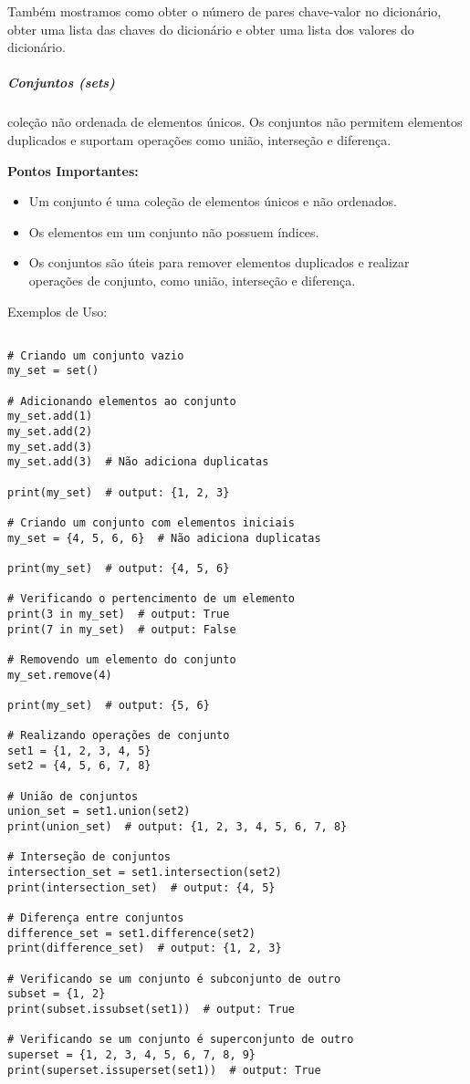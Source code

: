 \documentclass[a4paper, 12pt, onecolumn,singlespacing]{article}
\begin{document}
Também mostramos como obter o número de pares chave-valor no dicionário, obter uma lista das chaves do dicionário e obter uma lista dos valores do dicionário.

	\subparagraph{Conjuntos (\textit{sets})}\label{python_estrutura_conjuntos} coleção não ordenada de elementos únicos. Os conjuntos não permitem elementos duplicados e suportam operações como união, interseção e diferença.
	
	\textbf{Pontos Importantes:}
	\begin{itemize}
		\item Um conjunto é uma coleção de elementos únicos e não ordenados.
		\item Os elementos em um conjunto não possuem índices.
		\item Os conjuntos são úteis para remover elementos duplicados e realizar operações de conjunto, como união, interseção e diferença.
	\end{itemize}
		Exemplos de Uso:
	
	\begin{verbatim}

# Criando um conjunto vazio
my_set = set()

# Adicionando elementos ao conjunto
my_set.add(1)
my_set.add(2)
my_set.add(3)
my_set.add(3)  # Não adiciona duplicatas

print(my_set)  # output: {1, 2, 3}

# Criando um conjunto com elementos iniciais
my_set = {4, 5, 6, 6}  # Não adiciona duplicatas

print(my_set)  # output: {4, 5, 6}

# Verificando o pertencimento de um elemento
print(3 in my_set)  # output: True
print(7 in my_set)  # output: False

# Removendo um elemento do conjunto
my_set.remove(4)

print(my_set)  # output: {5, 6}

# Realizando operações de conjunto
set1 = {1, 2, 3, 4, 5}
set2 = {4, 5, 6, 7, 8}

# União de conjuntos
union_set = set1.union(set2)
print(union_set)  # output: {1, 2, 3, 4, 5, 6, 7, 8}

# Interseção de conjuntos
intersection_set = set1.intersection(set2)
print(intersection_set)  # output: {4, 5}

# Diferença entre conjuntos
difference_set = set1.difference(set2)
print(difference_set)  # output: {1, 2, 3}

# Verificando se um conjunto é subconjunto de outro
subset = {1, 2}
print(subset.issubset(set1))  # output: True

# Verificando se um conjunto é superconjunto de outro
superset = {1, 2, 3, 4, 5, 6, 7, 8, 9}
print(superset.issuperset(set1))  # output: True
		
	\end{verbatim}
\end{document}
